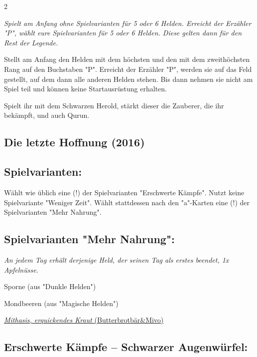 \documentclass[10pt, a4paper, oneside]{book}
\newcommand{\fan}[1]{\textit{#1}}
\begin{document}
\begin{multicols*}{2}
\begin{bgcolor}
\fan{Spielt am Anfang ohne Spielvarianten für 5 oder 6 Helden. Erreicht der Erzähler "P", wählt eure Spielvarianten für 5 oder 6 Helden. Diese gelten dann für den Rest der Legende.}

Stellt am Anfang den Helden mit dem höchsten und den mit dem zweithöchsten Rang auf den Buchstaben "P". Erreicht der Erzähler "P", werden sie auf das Feld gestellt, auf dem dann alle anderen Helden stehen. Bis dann nehmen sie nicht am Spiel teil und können keine Startausrüstung erhalten.
\supercite{DRidN10:5-6}


Spielt ihr mit dem Schwarzen Herold, stärkt dieser die Zauberer, die ihr bekämpft, und auch Qurun.
\supercite{DRidN:Begleitheft}

\end{bgcolor}


\columnbreak

\begin{bgcolor}
\section{Die letzte Hoffnung (2016)}


\subsection{Spielvarianten:}

Wählt wie üblich eine (!) der Spielvarianten "Erschwerte Kämpfe".
Nutzt keine Spielvariante "Weniger Zeit". Wählt stattdessen nach den "a"-Karten eine (!) der Spielvarianten "Mehr Nahrung".


\subsection{Spielvarianten "Mehr Nahrung":}

\bullet{} \fan{An jedem Tag erhält derjenige Held, der seinen Tag als erstes beendet, 1x Apfelnüsse.}

\bullet{} Sporne (aus "Dunkle Helden")
\supercite{DH:Sporne,DH17:a0_5-6}

\bullet{} Mondbeeren (aus "Magische Helden")
\supercite{MH:Mondbeeren,MH:Begleitheft}

\href{https://legenden-von-andor.de/forum/viewtopic.php?p=132952#p132952}
{\blacktriangleright \fan{Mithasis, erquickendes Kraut} (Butterbrotbär\&Mivo)}




\subsection{Erschwerte Kämpfe – Schwarzer Augenwürfel:}


\end{bgcolor}
\end{multicols*}
\end{document}
